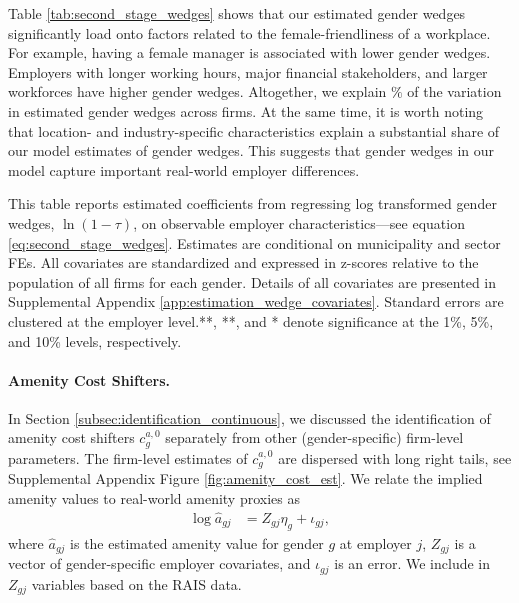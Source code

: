 Table \ref{tab:second_stage_wedges} shows that our estimated gender wedges significantly load onto factors related to the female-friendliness of a workplace. For example, having a female manager is associated with lower gender wedges. Employers with longer working hours, major financial stakeholders, and larger workforces have higher gender wedges. Altogether, we explain $\%$ of the variation in estimated gender wedges across firms. At the same time, it is worth noting that location- and industry-specific characteristics explain a substantial share of our model estimates of gender wedges. This suggests that gender wedges in our model capture important real-world employer differences.

%
\begin{table}[htbp!]
    \caption{Regressing estimates of transformed gender wedges on employer characteristics}
    \label{tab:second_stage_wedges}
    
    \begin{tablenotes}
        \footnotesize
        This table reports estimated coefficients from regressing log transformed gender wedges, $\ln(1 - \tau)$, on observable employer characteristics---see equation \eqref{eq:second_stage_wedges}. Estimates are conditional on municipality and sector FEs. All covariates are standardized and expressed in z-scores relative to the population of all firms for each gender. Details of all covariates are presented in Supplemental Appendix \ref{app:estimation_wedge_covariates}. Standard errors are clustered at the employer level.\ifshowstars ***, **, and * denote significance at the 1\%, 5\%, and 10\% levels, respectively.\fi{}
    \end{tablenotes}
    \begin{tablenotes}[Source]
        \sourcemodel%
    \end{tablenotes}
\end{table}
%


\paragraph{Amenity Cost Shifters.}

In Section \ref{subsec:identification_continuous}, we discussed the identification of amenity cost shifters $c_{g}^{a, 0}$ separately from other (gender-specific) firm-level parameters. The firm-level estimates of $c_{g}^{a, 0}$ are dispersed with long right tails, see Supplemental Appendix Figure \ref{fig:amenity_cost_est}. %
%
We relate the implied amenity values to real-world amenity proxies as
%
\begin{align}
    \log \widehat{a}_{gj} &= Z_{gj}\eta_{g} + \iota_{gj}, \label{eq:second_stage_amenities}
\end{align}
%
where $\widehat{a}_{gj}$ is the estimated amenity value for gender $g$ at employer $j$, $Z_{gj}$ is a vector of gender-specific employer covariates, and $\iota_{gj}$ is an error. We include in $Z_{gj}$ {\NAmenityCovariates} variables based on the RAIS data.

